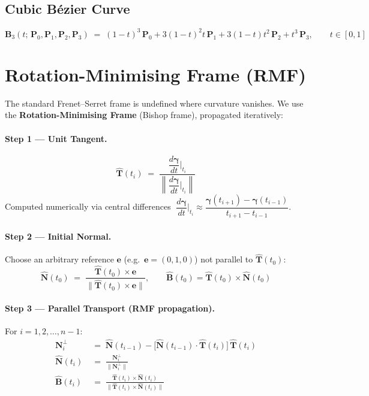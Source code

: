 \documentclass[12pt,a4paper]{article}
\newcommand{\vv}[1]{\bm{#1}}          %
\newcommand{\T}{\hat{\bm{T}}}         %
\begin{document}
\subsection{Cubic Bézier Curve}
\begin{equation}
  \vv{B}_3(t;\,\vv{P}_0,\vv{P}_1,\vv{P}_2,\vv{P}_3)
  \;=\;
  (1-t)^3\,\vv{P}_0
  + 3(1-t)^2t\,\vv{P}_1
  + 3(1-t)t^2\,\vv{P}_2
  + t^3\,\vv{P}_3,
  \qquad t\in[0,1]
\end{equation}

\section{Rotation-Minimising Frame (RMF)}
\label{sec:rmf}

The standard Frenet–Serret frame is undefined where curvature vanishes.
We use the \textbf{Rotation-Minimising Frame} (Bishop frame), propagated
iteratively:

\paragraph{Step 1 — Unit Tangent.}
\begin{equation}
  \T(t_i)
  \;=\;
  \frac{\dfrac{d\vv{\gamma}}{dt}\bigg|_{t_i}}
       {\left\lVert \dfrac{d\vv{\gamma}}{dt}\bigg|_{t_i} \right\rVert}
\end{equation}
Computed numerically via central differences
$\;\dfrac{d\vv{\gamma}}{dt}\big|_{t_i} \approx
 \dfrac{\vv{\gamma}(t_{i+1})-\vv{\gamma}(t_{i-1})}{t_{i+1}-t_{i-1}}$.

\paragraph{Step 2 — Initial Normal.}
Choose an arbitrary reference $\vv{e}$
(e.g.\ $\vv{e}=(0,1,0)$) not parallel to $\T(t_0)$:
\begin{equation}
  \hat{\vv{N}}(t_0)
  \;=\;
  \frac{\T(t_0)\times\vv{e}}{\lVert\T(t_0)\times\vv{e}\rVert},
  \qquad
  \hat{\vv{B}}(t_0) = \T(t_0)\times\hat{\vv{N}}(t_0)
\end{equation}

\paragraph{Step 3 — Parallel Transport (RMF propagation).}
For $i = 1, 2, \ldots, n-1$:
\begin{align}
  \vv{N}^\perp_i
  &\;=\;
  \hat{\vv{N}}(t_{i-1})
  - \bigl[\hat{\vv{N}}(t_{i-1})\cdot\T(t_i)\bigr]\,\T(t_i)
  \\[4pt]
  \hat{\vv{N}}(t_i)
  &\;=\;
  \frac{\vv{N}^\perp_i}{\lVert\vv{N}^\perp_i\rVert}
  \\[4pt]
  \hat{\vv{B}}(t_i)
  &\;=\;
  \frac{\T(t_i)\times\hat{\vv{N}}(t_i)}
       {\lVert\T(t_i)\times\hat{\vv{N}}(t_i)\rVert}
\end{align}
\end{document}
